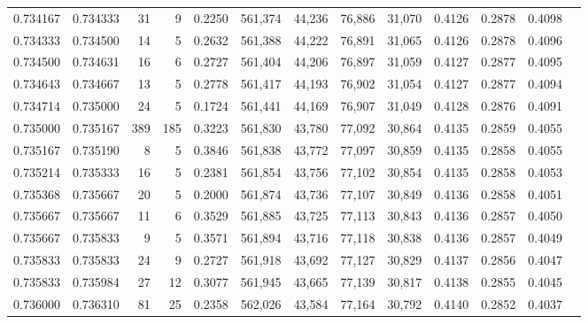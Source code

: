 \begin{tabular}{rrrrrrrrrrrrr}
0.734167 & 0.734333 &    31 &   9 &                                     0.2250 & 561,374 &  44,236 &  76,886 &  31,070 & 0.4126 & 0.2878 & 0.4098 \\
0.734333 & 0.734500 &    14 &   5 &                                     0.2632 & 561,388 &  44,222 &  76,891 &  31,065 & 0.4126 & 0.2878 & 0.4096 \\
0.734500 & 0.734631 &    16 &   6 &                                     0.2727 & 561,404 &  44,206 &  76,897 &  31,059 & 0.4127 & 0.2877 & 0.4095 \\
0.734643 & 0.734667 &    13 &   5 &                                     0.2778 & 561,417 &  44,193 &  76,902 &  31,054 & 0.4127 & 0.2877 & 0.4094 \\
0.734714 & 0.735000 &    24 &   5 &                                     0.1724 & 561,441 &  44,169 &  76,907 &  31,049 & 0.4128 & 0.2876 & 0.4091 \\
0.735000 & 0.735167 &   389 & 185 &                                     0.3223 & 561,830 &  43,780 &  77,092 &  30,864 & 0.4135 & 0.2859 & 0.4055 \\
0.735167 & 0.735190 &     8 &   5 &                                     0.3846 & 561,838 &  43,772 &  77,097 &  30,859 & 0.4135 & 0.2858 & 0.4055 \\
0.735214 & 0.735333 &    16 &   5 &                                     0.2381 & 561,854 &  43,756 &  77,102 &  30,854 & 0.4135 & 0.2858 & 0.4053 \\
0.735368 & 0.735667 &    20 &   5 &                                     0.2000 & 561,874 &  43,736 &  77,107 &  30,849 & 0.4136 & 0.2858 & 0.4051 \\
0.735667 & 0.735667 &    11 &   6 &                                     0.3529 & 561,885 &  43,725 &  77,113 &  30,843 & 0.4136 & 0.2857 & 0.4050 \\
0.735667 & 0.735833 &     9 &   5 &                                     0.3571 & 561,894 &  43,716 &  77,118 &  30,838 & 0.4136 & 0.2857 & 0.4049 \\
0.735833 & 0.735833 &    24 &   9 &                                     0.2727 & 561,918 &  43,692 &  77,127 &  30,829 & 0.4137 & 0.2856 & 0.4047 \\
0.735833 & 0.735984 &    27 &  12 &                                     0.3077 & 561,945 &  43,665 &  77,139 &  30,817 & 0.4138 & 0.2855 & 0.4045 \\
0.736000 & 0.736310 &    81 &  25 &                                     0.2358 & 562,026 &  43,584 &  77,164 &  30,792 & 0.4140 & 0.2852 & 0.4037 \\

\end{tabular}
